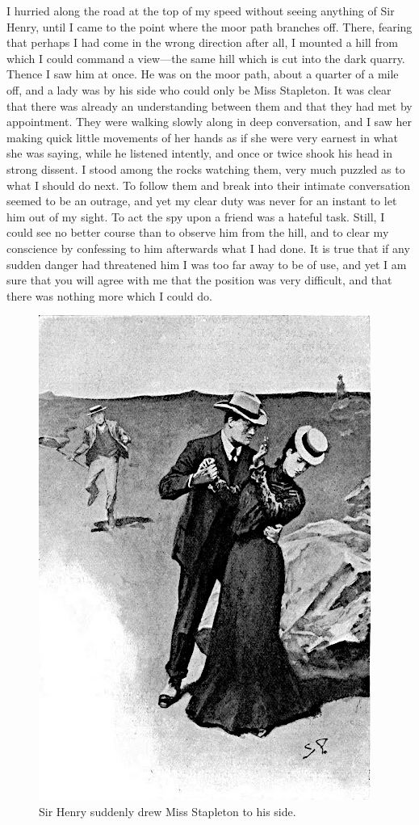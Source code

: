\documentclass[paper=a5,BCOR=7mm,twoside,DIV=calc,12pt,usegeometry,openany,chapterprefix,endperiod,headings=big]{scrbook} %
\begin{document}
I hurried along the road at the top of my speed without seeing anything of Sir Henry, until I came to the point where the moor path branches off. There, fearing that perhaps I had come in the wrong direction after all, I mounted a hill from which I could command a view---the same hill which is cut into the dark quarry. Thence I saw him at once. He was on the moor path, about a quarter of a mile off, and a lady was by his side who could only be Miss Stapleton. It was clear that there was already an understanding between them and that they had met by appointment. They were walking slowly along in deep conversation, and I saw her making quick little movements of her hands as if she were very earnest in what she was saying, while he listened intently, and once or twice shook his head in strong dissent. I stood among the rocks watching them, very much puzzled as to what I should do next. To follow them and break into their intimate conversation seemed to be an outrage, and yet my clear duty was never for an instant to let him out of my sight. To act the spy upon a friend was a hateful task. Still, I could see no better course than to observe him from the hill, and to clear my conscience by confessing to him afterwards what I had done. It is true that if any sudden danger had threatened him I was too far away to be of use, and yet I am sure that you will agree with me that the position was very difficult, and that there was nothing more which I could do.

\begin{figure}[tbh!]
\centering
\includegraphics[width=.7\linewidth]{09_drewmiss}
\caption{Sir Henry suddenly drew Miss Stapleton to his side.}
\end{figure}
\end{document}
